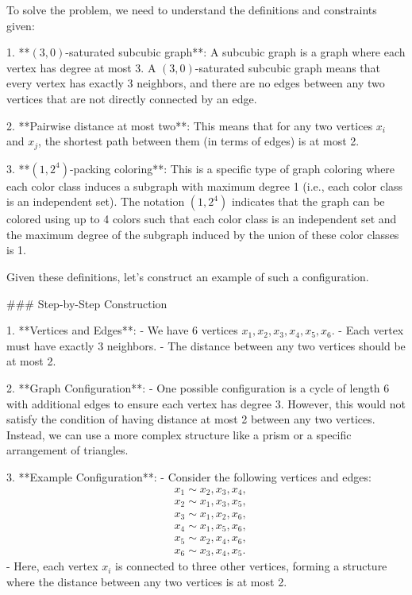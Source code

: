 To solve the problem, we need to understand the definitions and constraints given:

1. **$(3,0)$-saturated subcubic graph**: A subcubic graph is a graph where each vertex has degree at most 3. A $(3,0)$-saturated subcubic graph means that every vertex has exactly 3 neighbors, and there are no edges between any two vertices that are not directly connected by an edge.

2. **Pairwise distance at most two**: This means that for any two vertices \(x_i\) and \(x_j\), the shortest path between them (in terms of edges) is at most 2.

3. **$(1,2^4)$-packing coloring**: This is a specific type of graph coloring where each color class induces a subgraph with maximum degree 1 (i.e., each color class is an independent set). The notation $(1,2^4)$ indicates that the graph can be colored using up to 4 colors such that each color class is an independent set and the maximum degree of the subgraph induced by the union of these color classes is 1.

Given these definitions, let's construct an example of such a configuration.

### Step-by-Step Construction

1. **Vertices and Edges**:
   - We have 6 vertices \(x_1, x_2, x_3, x_4, x_5, x_6\).
   - Each vertex must have exactly 3 neighbors.
   - The distance between any two vertices should be at most 2.

2. **Graph Configuration**:
   - One possible configuration is a cycle of length 6 with additional edges to ensure each vertex has degree 3. However, this would not satisfy the condition of having distance at most 2 between any two vertices. Instead, we can use a more complex structure like a prism or a specific arrangement of triangles.

3. **Example Configuration**:
   - Consider the following vertices and edges:
     \[
     \begin{aligned}
     &x_1 \sim x_2, x_3, x_4, \\
     &x_2 \sim x_1, x_3, x_5, \\
     &x_3 \sim x_1, x_2, x_6, \\
     &x_4 \sim x_1, x_5, x_6, \\
     &x_5 \sim x_2, x_4, x_6, \\
     &x_6 \sim x_3, x_4, x_5.
     \end{aligned}
     \]
   - Here, each vertex \(x_i\) is connected to three other vertices, forming a structure where the distance between any two vertices is at most 2.

